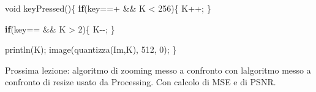 \documentclass[
]{article}
\newenvironment{Shaded}{}{}
\newcommand{\CharTok}[1]{\textcolor[rgb]{0.25,0.44,0.63}{#1}}
\newcommand{\ControlFlowTok}[1]{\textcolor[rgb]{0.00,0.44,0.13}{\textbf{#1}}}
\newcommand{\DataTypeTok}[1]{\textcolor[rgb]{0.56,0.13,0.00}{#1}}
\newcommand{\DecValTok}[1]{\textcolor[rgb]{0.25,0.63,0.44}{#1}}
\newcommand{\FunctionTok}[1]{\textcolor[rgb]{0.02,0.16,0.49}{#1}}
\newcommand{\NormalTok}[1]{#1}
\newcommand{\OperatorTok}[1]{\textcolor[rgb]{0.40,0.40,0.40}{#1}}
\begin{document}
\begin{Shaded}
\begin{Highlighting}[]
\DataTypeTok{void} \FunctionTok{keyPressed}\OperatorTok{()\{}
  \ControlFlowTok{if}\OperatorTok{(}\NormalTok{key}\OperatorTok{==}\CharTok{\textquotesingle{}+\textquotesingle{}} \OperatorTok{\&\&}\NormalTok{ K }\OperatorTok{\textless{}} \DecValTok{256}\OperatorTok{)\{}
\NormalTok{    K}\OperatorTok{++;}
   \OperatorTok{\}}
   
   \ControlFlowTok{if}\OperatorTok{(}\NormalTok{key}\OperatorTok{==}\CharTok{\textquotesingle{}{-}\textquotesingle{}} \OperatorTok{\&\&}\NormalTok{ K }\OperatorTok{\textgreater{}} \DecValTok{2}\OperatorTok{)\{}
\NormalTok{    K}\OperatorTok{{-}{-};}
   \OperatorTok{\}}
   
   \FunctionTok{println}\OperatorTok{(}\NormalTok{K}\OperatorTok{);}
   \FunctionTok{image}\OperatorTok{(}\FunctionTok{quantizza}\OperatorTok{(}\NormalTok{Im}\OperatorTok{,}\NormalTok{K}\OperatorTok{),} \DecValTok{512}\OperatorTok{,} \DecValTok{0}\OperatorTok{);}
\OperatorTok{\}}
\end{Highlighting}
\end{Shaded}

Prossima lezione: algoritmo di zooming messo a confronto con
l\textquotesingle algoritmo messo a confronto di resize usato da
Processing. Con calcolo di MSE e di PSNR.
\end{document}
